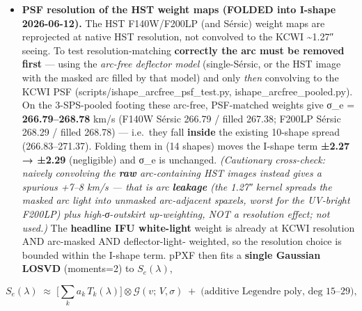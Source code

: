 \documentclass[
]{article}
\providecommand{\tightlist}{%
  \setlength{\itemsep}{0pt}\setlength{\parskip}{0pt}}
\newcommand{\BreakablePath}[1]{{\ttfamily\sloppy #1}}
\begin{document}
\begin{itemize}
  \begin{itemize}
  \tightlist
  \item
    \textbf{PSF resolution of the HST weight maps (FOLDED into I-shape
    2026-06-12).} The HST F140W/F200LP (and Sérsic) weight maps are
    reprojected at native HST resolution, not convolved to the KCWI
    \textasciitilde1.27″ seeing. To test resolution-matching
    \textbf{correctly the arc must be removed first} --- using the
    \emph{arc-free deflector model} (single-Sérsic, or the HST image
    with the masked arc filled by that model) and only \emph{then}
    convolving to the KCWI PSF
    (\BreakablePath{scripts/\discretionary{}{}{}ishape\_\discretionary{}{}{}arcfree\_\discretionary{}{}{}psf\_\discretionary{}{}{}test.\discretionary{}{}{}py},
    \BreakablePath{ishape\_\discretionary{}{}{}arcfree\_\discretionary{}{}{}pooled.\discretionary{}{}{}py}).
    On the 3-SPS-pooled footing these arc-free, PSF-matched weights give
    σ\_e = \textbf{266.79--268.78} km/s (F140W Sérsic 266.79 / filled
    267.38; F200LP Sérsic 268.29 / filled 268.78) --- i.e.~they fall
    \textbf{inside} the existing 10-shape spread (266.83--271.37).
    Folding them in (14 shapes) moves the I-shape term \textbf{±2.27 →
    ±2.29} (negligible) and σ\_e is unchanged. \emph{(Cautionary
    cross-check: naively convolving the \textbf{raw} arc-containing HST
    images instead gives a spurious +7--8 km/s --- that is arc
    \textbf{leakage} (the 1.27″ kernel spreads the masked arc light into
    unmasked arc-adjacent spaxels, worst for the UV-bright F200LP) plus
    high-σ-outskirt up-weighting, NOT a resolution effect; not used.)}
    The \textbf{headline IFU white-light} weight is already at KCWI
    resolution AND arc-masked AND deflector-light- weighted, so the
    resolution choice is bounded within the I-shape term. pPXF then fits
    a \textbf{single Gaussian LOSVD} (\BreakablePath{moments=2}) to
    \(S_e(\lambda)\),
  \end{itemize}

  \[S_e(\lambda) \;\approx\; \Big[\textstyle\sum_k a_k\, T_k(\lambda)\Big] \otimes \mathcal{G}(v;\,V,\sigma)
    \;+\; \text{(additive Legendre poly, deg 15–29)},\]


\end{itemize}
\end{document}
